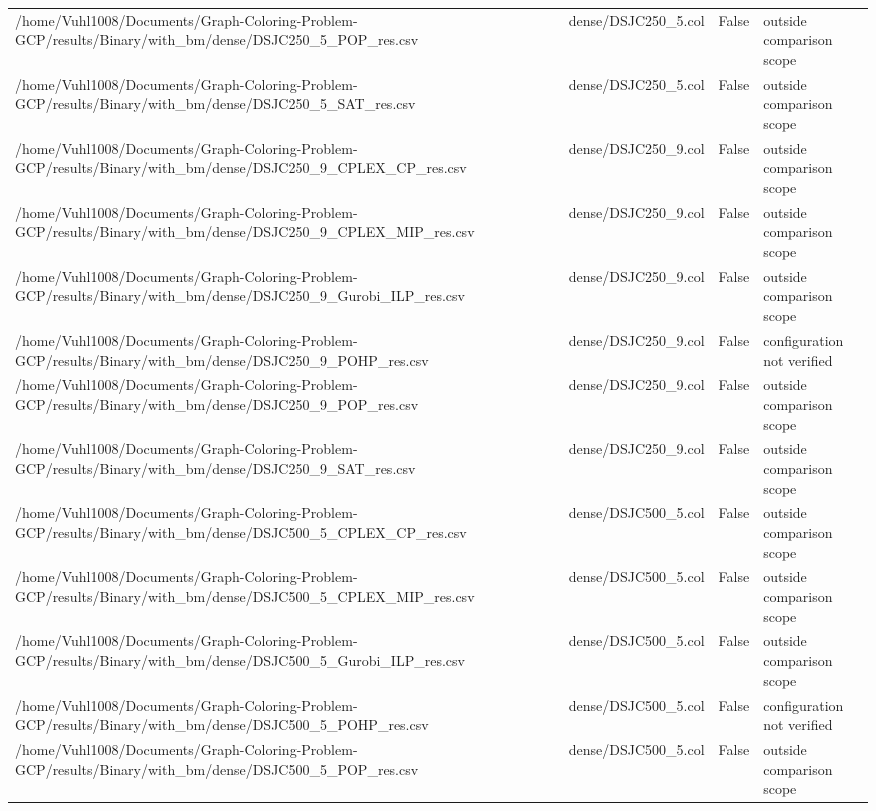 \begin{table}[htbp]
\begin{tabular}{llll}
/home/Vuhl1008/Documents/Graph-Coloring-Problem-GCP/results/Binary/with\_bm/dense/DSJC250\_5\_POP\_res.csv & dense/DSJC250\_5.col & False & outside comparison scope \\
/home/Vuhl1008/Documents/Graph-Coloring-Problem-GCP/results/Binary/with\_bm/dense/DSJC250\_5\_SAT\_res.csv & dense/DSJC250\_5.col & False & outside comparison scope \\
/home/Vuhl1008/Documents/Graph-Coloring-Problem-GCP/results/Binary/with\_bm/dense/DSJC250\_9\_CPLEX\_CP\_res.csv & dense/DSJC250\_9.col & False & outside comparison scope \\
/home/Vuhl1008/Documents/Graph-Coloring-Problem-GCP/results/Binary/with\_bm/dense/DSJC250\_9\_CPLEX\_MIP\_res.csv & dense/DSJC250\_9.col & False & outside comparison scope \\
/home/Vuhl1008/Documents/Graph-Coloring-Problem-GCP/results/Binary/with\_bm/dense/DSJC250\_9\_Gurobi\_ILP\_res.csv & dense/DSJC250\_9.col & False & outside comparison scope \\
/home/Vuhl1008/Documents/Graph-Coloring-Problem-GCP/results/Binary/with\_bm/dense/DSJC250\_9\_POHP\_res.csv & dense/DSJC250\_9.col & False & configuration not verified \\
/home/Vuhl1008/Documents/Graph-Coloring-Problem-GCP/results/Binary/with\_bm/dense/DSJC250\_9\_POP\_res.csv & dense/DSJC250\_9.col & False & outside comparison scope \\
/home/Vuhl1008/Documents/Graph-Coloring-Problem-GCP/results/Binary/with\_bm/dense/DSJC250\_9\_SAT\_res.csv & dense/DSJC250\_9.col & False & outside comparison scope \\
/home/Vuhl1008/Documents/Graph-Coloring-Problem-GCP/results/Binary/with\_bm/dense/DSJC500\_5\_CPLEX\_CP\_res.csv & dense/DSJC500\_5.col & False & outside comparison scope \\
/home/Vuhl1008/Documents/Graph-Coloring-Problem-GCP/results/Binary/with\_bm/dense/DSJC500\_5\_CPLEX\_MIP\_res.csv & dense/DSJC500\_5.col & False & outside comparison scope \\
/home/Vuhl1008/Documents/Graph-Coloring-Problem-GCP/results/Binary/with\_bm/dense/DSJC500\_5\_Gurobi\_ILP\_res.csv & dense/DSJC500\_5.col & False & outside comparison scope \\
/home/Vuhl1008/Documents/Graph-Coloring-Problem-GCP/results/Binary/with\_bm/dense/DSJC500\_5\_POHP\_res.csv & dense/DSJC500\_5.col & False & configuration not verified \\
/home/Vuhl1008/Documents/Graph-Coloring-Problem-GCP/results/Binary/with\_bm/dense/DSJC500\_5\_POP\_res.csv & dense/DSJC500\_5.col & False & outside comparison scope \\

\end{tabular}
\end{table}
